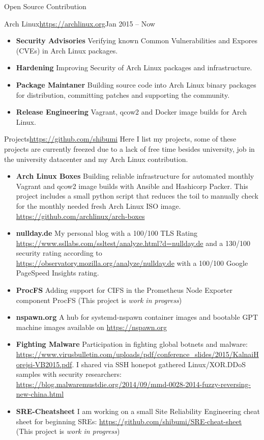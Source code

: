\documentclass[]{mcdowellcv}
\begin{document}
\begin{cvsection}{Open Source Contribution}
\begin{cvsubsection}{Arch Linux}{\url{https://archlinux.org}}{Jan 2015 -- Now}
\begin{itemize}
\item \textbf{Security Advisories} Verifying known Common Vulnerabilities and Expores (CVEs) in Arch Linux packages.
\item \textbf{Hardening} Improving Security of Arch Linux packages and infrastructure.
\item \textbf{Package Maintaner} Building source code into Arch Linux binary packages for distribution, committing patches and supporting the community.
\item \textbf{Release Engineering} Vagrant, qcow2 and Docker image builds for Arch Linux.
\end{itemize}
\end{cvsubsection}

\begin{cvsubsection}{Projects}{\url{https://github.com/shibumi}}{}
Here I list my projects, some of these projects are currently freezed due to a lack of free time besides university, job in the university datacenter and my Arch Linux contribution.
\begin{itemize}
\item \textbf{Arch Linux Boxes} Building reliable infrastructure for automated monthly Vagrant and qcow2 image builds with Ansible and Hashicorp Packer. This project includes a small python script that reduces the toil to manually check for the monthly needed fresh Arch Linux ISO image. \url{https://github.com/archlinux/arch-boxes}
\item \textbf{nullday.de} My personal blog with a 100/100 TLS Rating \url{https://www.ssllabs.com/ssltest/analyze.html?d=nullday.de} and a 130/100 security rating according to \url{https://observatory.mozilla.org/analyze/nullday.de} with a 100/100 Google PageSpeed Insights rating.
\item \textbf{ProcFS} Adding support for CIFS in the Prometheus Node Exporter component ProcFS (This project is \textit{work in progress})
\item \textbf{nspawn.org} A hub for systemd-nspawn container images and bootable GPT machine images available on \url{https://nspawn.org}
\item \textbf{Fighting Malware} Participation in fighting global botnets and malware: \url{https://www.virusbulletin.com/uploads/pdf/conference_slides/2015/KalnaiHorejsi-VB2015.pdf}. I shared via SSH honepot gathered Linux/XOR.DDoS samples with security researchers: \url{https://blog.malwaremustdie.org/2014/09/mmd-0028-2014-fuzzy-reversing-new-china.html}
\item \textbf{SRE-Cheatsheet} I am working on a small Site Reliability Engineering cheat sheet for beginning SREs: \url{https://github.com/shibumi/SRE-cheat-sheet} (This project is \textit{work in progress})
\end{itemize}
\end{cvsubsection}
\end{cvsection}
\end{document}
